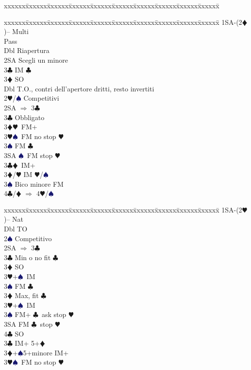 \documentclass[a4paper,italian]{article}
\newcommand{\BC}{\textcolor{OliveGreen}{$\clubsuit$}}
\newcommand{\BD}{\textcolor{RedOrange}{$\vardiamondsuit$}}
\newcommand{\BH}{\textcolor{Red2}{$\varheartsuit${}}}
\newcommand{\BS}{\textcolor{MidnightBlue}{$\spadesuit${}}}
\newenvironment{bidtable}
{\begin{tabbing}

    xxxxxx\=xxxxxx\=xxxxxx\=xxxxxx\=xxxxxx\=xxxxxx\=xxxxxx\=xxxxxx\=xxxxxx\=xxxxxx\=\kill}
{\end{tabbing} }%
\begin{document}
\begin{multicols}{2}
\begin{bidtable}
    \end{bidtable}
    \begin{bidtable}
        1SA-(2\BD)-- \>\> Multi\+\\
        Pass\+\\
        Dbl \> Riapertura\\
        2SA \> Scegli un minore\\
        3\BC \> IM \BC \\
        3\BD \> SO\-\\
        Dbl \> T.O., contri dell'apertore dritti, resto invertiti\\
        2\BH/\BS \> Competitivi\\
        2SA \> $\Rightarrow$ 3\BC \+\\
        3\BC \> Obbligato\+\\
        3\BD {}\BH\ FM+\\
        3\BH {}\BS\ FM no stop \BH \\
        3\BS \> FM \BC \\
        3SA \BS\ FM stop \BH \-\-\\
        3\BC {}\BD\ IM+\\
        3\BD/\BH \> IM \BH /\BS \\
        3\BS \> Bico minore FM\\
        4\BC/\BD \> $\Rightarrow$ 4\BH /\BS \-
    \end{bidtable}
    \begin{bidtable}
        1SA-(2\BH)--\> \> Nat\+\\
        Dbl \> TO\\
        2\BS \> Competitivo\\
        2SA \> $\Rightarrow$ 3\BC \+\\
        3\BC \> Min o no fit \BC\+\\
        3\BD \> SO\\
        3\BH {}+\BS\ IM\\
        3\BS \> FM \BC \-\\
        3\BD \> Max, fit \BC \+\\
        3\BH {}+\BS\ IM\\
        3\BS \> FM+ \BC\ ask stop \BH \\
        3SA \> FM \BC\ stop \BH \\
        4\BC \> SO\-\-\\
        3\BC \> IM+ 5+\BD \\
        3\BD {}+\BS 5+minore IM+\\
        3\BH {}\BS\ FM no stop \BH \\

\end{bidtable}
\end{multicols}
\end{document}
